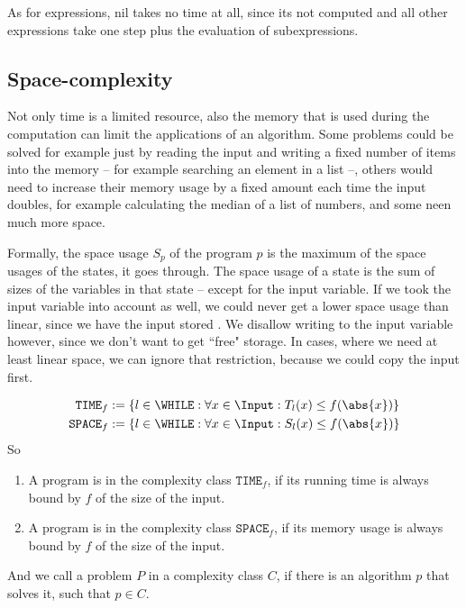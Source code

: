 As for expressions, nil takes no time at all, since its not computed and all
other expressions take one step plus the evaluation of subexpressions.

\subsection{Space-complexity}
Not only time is a limited resource, also the memory that is used during the 
computation can limit the applications of an algorithm. Some problems could 
be solved for example just by reading the input and writing a fixed number of 
items into the memory -- for example searching an element in a list --, others
would need to increase their memory usage by a fixed amount each time the 
input doubles, for example calculating the median of a list of numbers, and 
some neen much more space.

Formally, the space usage $S_p$ of the program $p$ is the maximum of the space
usages of the states, it goes through. The space usage of a state is the sum of
sizes of the variables in that state -- except for the input variable. If we
took the input variable into account as well, we could never get a lower space
usage than linear, since we have the input stored . We disallow writing to
the input variable however, since we don't want to get ``free" storage. In 
cases, where we need at least linear space, we can ignore that restriction, 
because we could copy the input first.

\begin{defn}
	\begin{equation*}
		\begin{split}
			\mathtt{TIME}_f &:= \{l\in \WHILE : \forall x\in \Input: T_l(x) \leq f(\abs{x})\} \\
			\mathtt{SPACE}_f &:= \{l\in \WHILE : \forall x\in \Input: S_l(x) \leq f(\abs{x})\}
		\end{split}
	\end{equation*}
	So
	\begin{enumerate}
		\item A program is in the complexity class $\mathtt{TIME}_f$, if its running time is always bound 
			by $f$ of the size of the input.
		\item A program is in the complexity class $\mathtt{SPACE}_f$, if its memory usage is always bound 
			by $f$ of the size of the input.
	\end{enumerate}
	And we call a problem $P$ in a complexity class $C$, if there is an 
	algorithm $p$ that solves it, such that $p\in C$.
\end{defn}

